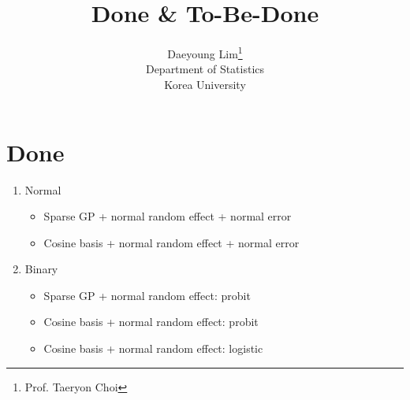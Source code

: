 \documentclass[11pt]{article}
\begin{document}
\nocite{*}

\title{Done \& To-Be-Done}

\author{Daeyoung Lim\thanks{Prof. Taeryon Choi} \\
Department of Statistics \\
Korea University}

\maketitle
\section{Done}
  \begin{enumerate}
    \item Normal
      \begin{itemize}
        \item Sparse GP + normal random effect + normal error
        \item Cosine basis + normal random effect + normal error
      \end{itemize}
    \item Binary
      \begin{itemize}
        \item Sparse GP + normal random effect: probit
        \item Cosine basis + normal random effect: probit
        \item Cosine basis + normal random effect: logistic
      \end{itemize}
  \end{enumerate}
\end{document}
